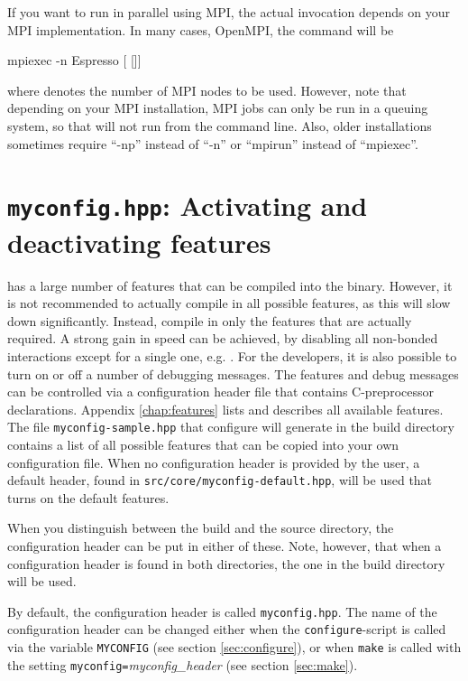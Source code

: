 If you want to run \es in parallel using MPI, the actual invocation
depends on your MPI implementation. In many cases, \eg OpenMPI, the
command will be
\begin{code}
mpiexec -n  Espresso [ []]
\end{code}
where  denotes the number of MPI nodes to be used.
However, note that depending on your MPI installation, MPI jobs can
only be run in a queuing system, so that \es will not run from the
command line. Also, older installations sometimes require ``-np''
instead of ``-n'' or ``mpirun'' instead of ``mpiexec''. 


\section{\texttt{myconfig.hpp}: Activating and deactivating features}
\label{sec:myconfig}

   \es
has a large number of features that can be compiled into the binary.
However, it is not recommended to actually compile in all possible
features, as this will slow down \es significantly.  Instead, compile
in only the features that are actually required.  A strong gain in
speed can be achieved, by disabling all non-bonded interactions except
for a single one, e.g. .  For the developers,
it is also possible to turn on or off a number of debugging messages.
The features and debug messages can be controlled via a configuration
header file that contains C-preprocessor declarations.  Appendix
\vref{chap:features} lists and describes all available features.  The
file \texttt{myconfig-sample.hpp} that configure will generate in the
build directory contains a list of all possible features that can be
copied into your own configuration file.  When no configuration header
is provided by the user, a default header, found in
\texttt{src/core/myconfig-default.hpp}, will be used that turns on the
default features.

When you distinguish between the build and the source directory, the
configuration header can be put in either of these. Note, however,
that when a configuration header is found in both directories, the one
in the build directory will be used.

By default, the configuration header is called \texttt{myconfig.hpp}.
The name of the configuration header can be changed either when the
\texttt{configure}-script is called via the variable
\mbox{\texttt{MYCONFIG}} (see section \vref{sec:configure}), or when
\texttt{make} is called with the setting
\mbox{\texttt{myconfig=}\textit{myconfig\_header}} (see section
\vref{sec:make}).

